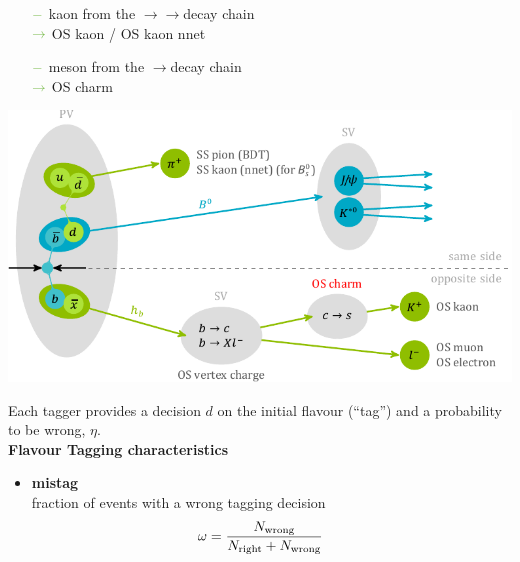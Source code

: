 {\begin{itemize}
\begin{itemize}
\item[${\color{tu_gruen}-}$] kaon from the \bquark$\rightarrow$\cquark$\rightarrow$\squark decay chain \\ ${\color{tu_gruen}\rightarrow}$ OS kaon / OS kaon nnet
\item[${\color{tu_gruen}-}$] \D meson from the \bquark$\rightarrow$\cquark decay chain \\ ${\color{tu_gruen}\rightarrow}$ OS charm
\end{itemize}
\end{itemize}
\begin{center}
\includegraphics[width=\textwidth]{FTScheme/FlavourTaggerScheme.pdf}
\end{center}
\vspace{-0.6em}
Each tagger provides a decision $d$ on the initial flavour \newline(“tag”) and a probability to be wrong,  $\eta$.\\[0.3cm]
\vspace{-0.75em}
\textbf{Flavour Tagging characteristics}
\vspace{0.1em}
\begin{itemize}
\item \textbf{mistag} \\[0.04cm] 
fraction of events with a wrong tagging decision
\begin{equation*}
\hspace{-1.6em}
\omega=\frac{N_{\text{wrong}}}{N_{\text{right}}+N_{\text{wrong}}}
\end{equation*}

\end{itemize}}
